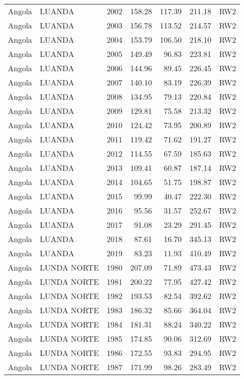 \begin{longtable}{lllrrrl}
  Angola & LUANDA & 2002 & 158.28 & 117.39 & 211.18 & RW2 \\ 
  Angola & LUANDA & 2003 & 156.78 & 113.52 & 214.57 & RW2 \\ 
  Angola & LUANDA & 2004 & 153.79 & 106.50 & 218.10 & RW2 \\ 
  Angola & LUANDA & 2005 & 149.49 & 96.83 & 223.81 & RW2 \\ 
  Angola & LUANDA & 2006 & 144.96 & 89.45 & 226.45 & RW2 \\ 
  Angola & LUANDA & 2007 & 140.10 & 83.19 & 226.39 & RW2 \\ 
  Angola & LUANDA & 2008 & 134.95 & 79.13 & 220.84 & RW2 \\ 
  Angola & LUANDA & 2009 & 129.81 & 75.58 & 213.32 & RW2 \\ 
  Angola & LUANDA & 2010 & 124.42 & 73.95 & 200.89 & RW2 \\ 
  Angola & LUANDA & 2011 & 119.42 & 71.62 & 191.27 & RW2 \\ 
  Angola & LUANDA & 2012 & 114.55 & 67.59 & 185.63 & RW2 \\ 
  Angola & LUANDA & 2013 & 109.41 & 60.87 & 187.14 & RW2 \\ 
  Angola & LUANDA & 2014 & 104.65 & 51.75 & 198.87 & RW2 \\ 
  Angola & LUANDA & 2015 & 99.99 & 40.47 & 222.30 & RW2 \\ 
  Angola & LUANDA & 2016 & 95.56 & 31.57 & 252.67 & RW2 \\ 
  Angola & LUANDA & 2017 & 91.08 & 23.29 & 291.45 & RW2 \\ 
  Angola & LUANDA & 2018 & 87.61 & 16.70 & 345.13 & RW2 \\ 
  Angola & LUANDA & 2019 & 83.23 & 11.93 & 410.49 & RW2 \\ 
  Angola & LUNDA NORTE & 1980 & 207.09 & 71.89 & 473.43 & RW2 \\ 
  Angola & LUNDA NORTE & 1981 & 200.22 & 77.95 & 427.42 & RW2 \\ 
  Angola & LUNDA NORTE & 1982 & 193.53 & 82.54 & 392.62 & RW2 \\ 
  Angola & LUNDA NORTE & 1983 & 186.32 & 85.66 & 364.04 & RW2 \\ 
  Angola & LUNDA NORTE & 1984 & 181.31 & 88.24 & 340.22 & RW2 \\ 
  Angola & LUNDA NORTE & 1985 & 174.85 & 90.06 & 312.69 & RW2 \\ 
  Angola & LUNDA NORTE & 1986 & 172.55 & 93.83 & 294.95 & RW2 \\ 
  Angola & LUNDA NORTE & 1987 & 171.99 & 98.26 & 283.49 & RW2 \\ 

\end{longtable}
